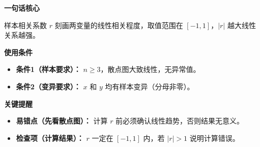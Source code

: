 \begin{summarybox}
	\textbf{\textcolor{CSummary}{一句话核心}}

	样本相关系数 $r$ 刻画两变量的线性相关程度，取值范围在 $[-1,1]$，$|r|$ 越大线性关系越强。

	\medskip
	\textbf{\textcolor{CSummary}{使用条件}}
	\begin{itemize}[leftmargin=*, itemsep=0.5em, topsep=0.4em]
		\item \textbf{条件1（样本要求）：} $n\ge3$，散点图大致线性，无异常值。
		\item \textbf{条件2（变异要求）：} $x$ 和 $y$ 均有样本变异（分母非零）。
	\end{itemize}

	\medskip
	\textbf{\textcolor{CSummary}{关键提醒}}
	\begin{itemize}[leftmargin=*, itemsep=0.5em, topsep=0.4em]
		\item \textbf{易错点（先看散点图）：} 计算 $r$ 前必须确认线性趋势，否则结果无意义。
		\item \textbf{检查项（计算结果）：} $r$ 一定在 $[-1,1]$ 内，若 $|r|>1$ 说明计算错误。
	\end{itemize}
\end{summarybox}
